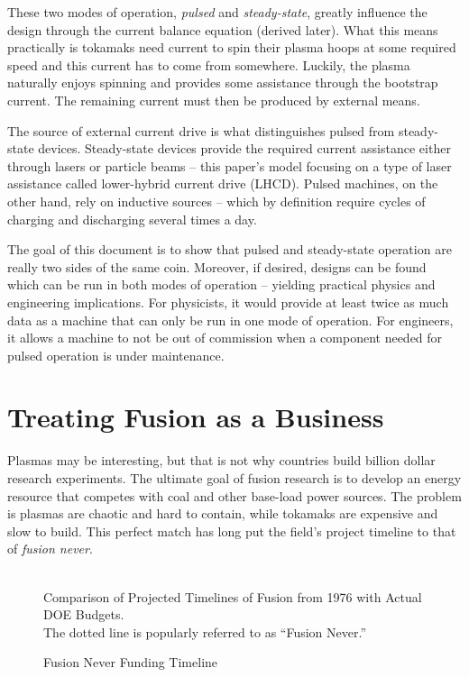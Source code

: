 These two modes of operation, \emph{pulsed} and \emph{steady-state}, greatly influence the design through the current balance equation (derived later). What this means practically is tokamaks need current to spin their plasma hoops at some required speed and this current has to come from somewhere. Luckily, the plasma naturally enjoys spinning and provides some assistance through the bootstrap current. The remaining current must then be produced by external means.

The source of external current drive is what distinguishes pulsed from steady-state devices. Steady-state devices provide the required current assistance either through lasers or particle beams -- this paper's model focusing on a type of laser assistance called lower-hybrid current drive (LHCD). \cite{jeff} Pulsed machines, on the other hand, rely on inductive sources -- which by definition require cycles of charging and discharging several times a day.

The goal of this document is to show that pulsed and steady-state operation are really two sides of the same coin. Moreover, if desired, designs can be found which can be run in both modes of operation -- yielding practical physics and engineering implications. For physicists, it would provide at least twice as much data as a machine that can only be run in one mode of operation. For engineers, it allows a machine to not be out of commission when a component needed for pulsed operation is under maintenance.

\section{Treating Fusion as a Business}

Plasmas may be interesting, but that is not why countries build billion dollar research experiments. The ultimate goal of fusion research is to develop an energy resource that competes with coal and other base-load power sources. The problem is plasmas are chaotic and hard to contain, while tokamaks are expensive and slow to build. This perfect match has long put the field's project timeline to that of \emph{fusion never}. \cite{fusionfunding}

\begin{figure}[h]
	\centering
	\begin{adjustbox}{width=0.75\textwidth}
		
	\end{adjustbox}
	\caption{Fusion Never Funding Timeline} ~\\
	\small Comparison of Projected Timelines of Fusion from 1976 with Actual DOE Budgets. \cite{doe87,doe19} \\ The dotted line is popularly referred to as  ``Fusion Never.'' \cite{fusionnever}
\end{figure}

